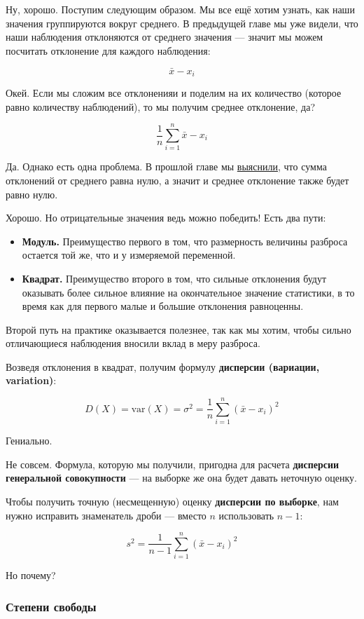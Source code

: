 \documentclass[
  letterpaper,
  DIV=11,
  numbers=noendperiod]{scrreprt}
\providecommand{\tightlist}{%
  \setlength{\itemsep}{0pt}\setlength{\parskip}{0pt}}\usepackage{longtable,booktabs,array}
\theoremstyle{definition}
\theoremstyle{remark}
\begin{document}
Ну, хорошо. Поступим следующим образом. Мы все ещё хотим узнать, как
наши значения группируются вокруг среднего. В предыдущей главе мы уже
видели, что наши наблюдения отклоняются от среднего значения --- значит
мы можем посчитать отклонение для каждого наблюдения:

\[
\bar x - x_i
\]

Окей. Если мы сложим все отклоненияи и поделим на их количество (которое
равно количеству наблюдений), то мы получим среднее отклонение, да?

\[
\frac{1}{n} \sum_{i=1}^n \bar x - x_i
\]

Да. Однако есть одна проблема. В прошлой главе мы
\hyperref[mean_features]{выяснили}, что сумма отклонений от среднего
равна нулю, а значит и среднее отклонение также будет равно нулю.

Хорошо. Но отрицательные значения ведь можно победить! Есть два пути:

\begin{itemize}
\tightlist
\item
  \textbf{Модуль.} Преимущество первого в том, что размерность величины
  разброса остается той же, что и у измеряемой переменной.
\item
  \textbf{Квадрат.} Преимущество второго в том, что сильные отклонения
  будут оказывать более сильное влияние на окончательное значение
  статистики, в то время как для первого малые и большие отклонения
  равноценны.
\end{itemize}

Второй путь на практике оказывается полезнее, так как мы хотим, чтобы
сильно отличающиеся наблюдения вносили вклад в меру разброса.

Возведя отклонения в квадрат, получим формулу \textbf{дисперсии
(вариации, variation)}:

\[
D(X) = \mathrm{var}(X) = \sigma^2 = \frac{1}{n} \sum_{i=1}^n (\bar x - x_i)^2
\]

Гениально.

Не совсем. Формула, которую мы получили, пригодна для расчета
\textbf{дисперсии генеральной совокупности} --- на выборке же она будет
давать неточную оценку.

Чтобы получить точную (несмещенную) оценку \textbf{дисперсии по
выборке}, нам нужно исправить знаменатель дроби --- вместо \(n\)
использовать \(n-1\):

\[
s^2 = \frac{1}{n-1} \sum_{i=1}^n (\bar x - x_i)^2
\]

Но почему?

\subsubsection{Степени свободы}\label{andan-descriptives-df}
\end{document}
